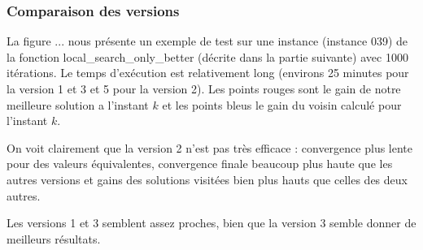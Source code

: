 \documentclass[10pt,a4paper]{article}
\begin{document}
\subsubsection{Comparaison des versions}

La figure ... nous présente un exemple de test sur une instance (instance 039) de la fonction local\_search\_only\_better (décrite dans la partie suivante) avec 1000 itérations. Le temps d’exécution est relativement long (environs 25 minutes pour la version 1 et 3 et 5 pour la version 2). Les points rouges sont le gain de notre meilleure solution a l'instant $k$ et les points bleus le gain du voisin calculé pour l'instant $k$.

On voit clairement que la version 2 n'est pas très efficace : convergence plus lente pour des valeurs équivalentes, convergence finale beaucoup plus haute que les autres versions et gains des solutions visitées bien plus hauts que celles des deux autres. 

Les versions 1 et 3 semblent assez proches, bien que la version 3 semble donner de meilleurs résultats.
\end{document}
